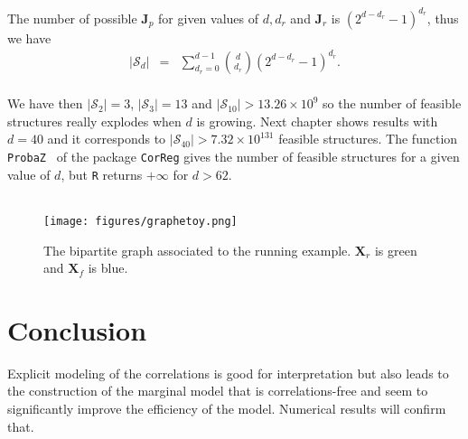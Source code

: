 \documentclass[12pt,a4paper]{report}
\begin{document}
			The number of possible $\boldsymbol{J}_p$ for given values of $d, d_r$ and $\boldsymbol{J}_r$ is $(2^{d-d_r}-1)^{d_r}$, thus we have
			\begin{eqnarray}
		|\mathcal{S}_d|&=&%
		 \sum_{d_r=0}^{d-1}{d \choose d_r}(2^{d-d_r}-1)^{d_r}. \nonumber
	\end{eqnarray}
	 \\
	We have then $|\mathcal{S}_2| =3 $, $|\mathcal{S}_3| =13 $ and $|\mathcal{S}_{10}| >13.26\times10^9 $ so the number of feasible structures really explodes when $d$ is growing. Next chapter shows results with $d=40$ and it corresponds to $|\mathcal{S}_{40}| >7.32\times10^{131} $ feasible structures. The function {\tt ProbaZ } of the package { \tt CorReg} gives the number of feasible structures for a given value of $d$, but {\tt R} returns $+\infty$ for $d>62$.\\
	\\
	\begin{figure}[h!]
	\centering
	\texttt{[image: figures/graphetoy.png]} 
	\caption{The bipartite graph associated to the running example. $\boldsymbol{X}_r$ is green and $\boldsymbol{X}_f$ is blue.}
	\end{figure}			
	
				
		\section{Conclusion} Explicit modeling of the correlations is good for interpretation but also leads to the construction of the marginal model that is correlations-free and seem to significantly improve the efficiency of the model. Numerical results will confirm that.
\end{document}
